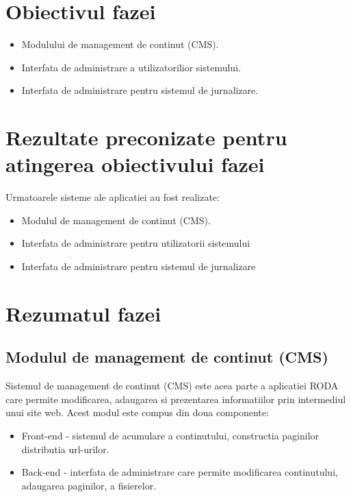 \documentclass[a4paper, 10pt]{article}
\begin{document}
{\section{Obiectivul fazei}


\begin{itemize}
\item
Modulului de management de continut (CMS).

\item
Interfata de administrare a utilizatorilior sistemului.

\item
Interfata de administrare pentru sistemul de jurnalizare.
\end{itemize}

\section{Rezultate preconizate pentru atingerea obiectivului fazei}

Urmatoarele sisteme ale aplicatiei au fost realizate:
\begin{itemize}
\item
Modulul de management de continut (CMS).
\item
Interfata de administrare pentru utilizatorii sistemului
\item
Interfata de administrare pentru sistemul de jurnalizare
\end{itemize}

\section{Rezumatul fazei}

\medskip

\subsection*{Modulul de management de continut (CMS)}


\bigskip

Sistemul de management de continut (CMS) este acea parte a aplicatiei RODA care permite modificarea, adaugarea si prezentarea informatiilor prin intermediul unui site web. Acest modul este compus din doua componente:


\begin{itemize}
\item
Front-end - sistemul de acumulare a continutului, constructia paginilor distributia url-urilor.
\item
Back-end - interfata de administrare care permite modificarea continutului, adaugarea paginilor, a fisierelor. 
\end{itemize}

}
\end{document}
